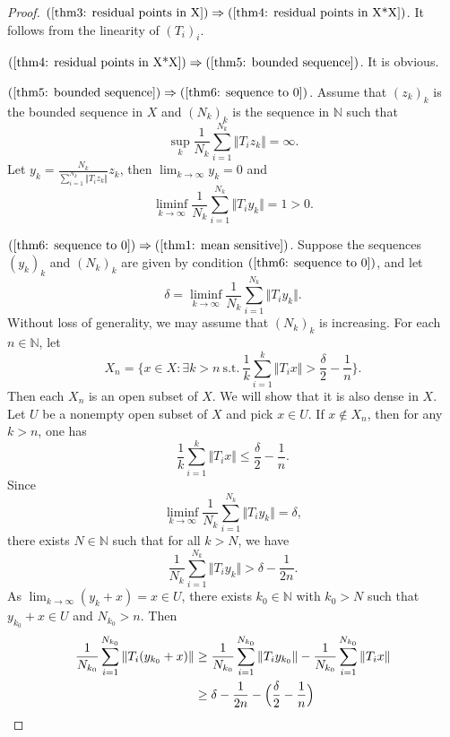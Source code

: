 \documentclass[12pt,a4paper]{amsart}
\theoremstyle{definition}
\theoremstyle{plain}
\begin{document}
\begin{proof}
     $(\ref{thm3: residual points in X}) \Rightarrow (\ref{thm4: residual points in X*X})$.  It follows from the linearity of $(T_i)_i$.

     $ (\ref{thm4: residual points in X*X}) \Rightarrow (\ref{thm5: bounded sequence})$.  It is obvious.

     $(\ref{thm5: bounded sequence}) \Rightarrow (\ref{thm6: sequence to 0})$. 
    Assume that $(z_k)_k$ is the bounded sequence in $X$ and
    $(N_k)_k$ is the sequence in $\mathbb{N}$ such that
    \[
        \sup_k \frac{1}{N_k}\sum_{i=1}^{N_k} \Vert T_iz_k \Vert =\infty.
    \]
    Let $y_k=\frac{N_k}{ \sum_{i=1}^{N_k} \Vert T_iz_k \Vert} z_k$,
    then $\lim_{k\to \infty}y_k=0$ and
    \[
        \liminf_{k\to \infty} \frac{1}{N_k}\sum_{i=1}^{N_k} \Vert T_iy_k \Vert =1>0.
    \]

     $ (\ref{thm6: sequence to 0}) \Rightarrow (\ref{thm1: mean sensitive})$. 
    Suppose the sequences $(y_k)_k$ and $(N_k)_k$ are given by condition $(\ref{thm6: sequence to 0})$, and let
    \[
        \delta=\liminf_{k\to\infty} \frac{1}{N_k}\sum_{i=1}^{N_k}\Vert T_i y_k\Vert.
    \]
    Without loss of generality, we may assume that $(N_k)_k$ is increasing.
    For each $n\in \mathbb{N}$, let
    \[
        X_n=\biggl\{ x\in X: \exists k>n \ \text{s.t.} \ \frac{1}{k}\sum_{i=1}^{k} \Vert T_ix \Vert >
        \frac{\delta}{2} -\frac{1}{n} \biggr\}.
    \]
    Then each $X_n$ is an open subset of $X$.
    We will show that it is also dense in $X$.
    Let $U$ be a nonempty open subset of $X$ and pick $x\in U$.
    If $x\notin X_n$, then for any $k>n$, one has
    \[
        \frac{1}{k}\sum_{i=1}^{k}\Vert T_ix \Vert \le \frac{\delta}{2} -\frac{1}{n}.
    \]
    Since
    \[
        \liminf_{k\to \infty} \frac{1}{N_k} \sum_{i=1}^{N_k} \Vert T_iy_k \Vert =\delta,
    \]
    there exists $N\in \mathbb{N}$ such that for all $k>N$,
    we have
    \[
        \frac{1}{N_k} \sum_{i=1}^{N_k} \Vert T_iy_k \Vert > \delta -\frac{1}{2n}.
    \]
    As $\lim_{k\to \infty} (y_k+x) = x\in U$,
    there exists $k_0\in \mathbb{N}$ with $k_0>N$ such that $y_{k_0}+x \in U$
    and $N_{k_0}>n$.
    Then
    \begin{align*}
        \frac{1}{N_{k_0}}\sum_{i=1}^{N_{k_0}}\Vert T_i (y_{k_0}+x)\Vert
         & \ge \frac{1}{N_{k_0}}\sum_{i=1}^{N_{k_0}}\Vert T_i y_{k_0}\Vert  -\frac{1}{N_{k_0}}\sum_{i=1}^{N_{k_0}}\Vert T_i x\Vert \\
         & \ge \delta-\frac{1}{2n} - \Bigl(\frac{\delta}{2} - \frac{1}{n}\Bigr)                                                    \\

\end{align*}
\end{proof}
\end{document}
